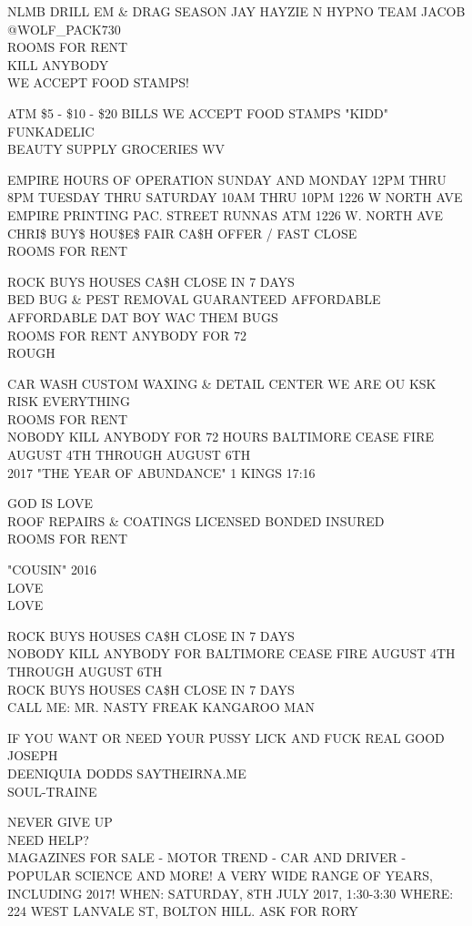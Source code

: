 \documentclass[10pt,letterpaper]{article}
\begin{document}
NLMB DRILL EM \& DRAG SEASON JAY HAYZIE N HYPNO TEAM JACOB @WOLF\_PACK730\\
ROOMS FOR RENT\\
KILL ANYBODY\\
WE ACCEPT FOOD STAMPS!

ATM \$5 {-} \$10 {-} \$20 BILLS WE ACCEPT FOOD STAMPS "KIDD" FUNKADELIC\\
BEAUTY SUPPLY GROCERIES WV

EMPIRE HOURS OF OPERATION SUNDAY AND MONDAY 12PM THRU 8PM TUESDAY THRU SATURDAY 10AM THRU 10PM 1226 W NORTH AVE\\
EMPIRE PRINTING PAC. STREET RUNNAS ATM 1226 W. NORTH AVE\\
CHRI\$ BUY\$ HOU\$E\$ FAIR CA\$H OFFER / FAST CLOSE\\
ROOMS FOR RENT

ROCK BUYS HOUSES CA\$H CLOSE IN 7 DAYS\\
BED BUG \& PEST REMOVAL GUARANTEED AFFORDABLE AFFORDABLE DAT BOY WAC THEM BUGS\\
ROOMS FOR RENT ANYBODY FOR 72\\
ROUGH

CAR WASH CUSTOM WAXING \& DETAIL CENTER WE ARE OU KSK RISK EVERYTHING\\
ROOMS FOR RENT\\
NOBODY KILL ANYBODY FOR 72 HOURS BALTIMORE CEASE FIRE AUGUST 4TH THROUGH AUGUST 6TH\\
2017 "THE YEAR OF ABUNDANCE" 1 KINGS 17:16

GOD IS LOVE\\
ROOF REPAIRS \& COATINGS LICENSED BONDED INSURED\\
ROOMS FOR RENT

"COUSIN" 2016\\
LOVE\\
LOVE

ROCK BUYS HOUSES CA\$H CLOSE IN 7 DAYS\\
NOBODY KILL ANYBODY FOR BALTIMORE CEASE FIRE AUGUST 4TH THROUGH AUGUST 6TH\\
ROCK BUYS HOUSES CA\$H CLOSE IN 7 DAYS\\
CALL ME: MR. NASTY FREAK KANGAROO MAN

IF YOU WANT OR NEED YOUR PUSSY LICK AND FUCK REAL GOOD JOSEPH\\
DEENIQUIA DODDS SAYTHEIRNA.ME\\
SOUL{-}TRAINE

NEVER GIVE UP\\
NEED HELP?\\
MAGAZINES FOR SALE {-} MOTOR TREND {-} CAR AND DRIVER {-} POPULAR SCIENCE AND MORE!  A VERY WIDE RANGE OF YEARS, INCLUDING 2017!  WHEN: SATURDAY, 8TH JULY 2017, 1:30{-}3:30 WHERE: 224 WEST LANVALE ST, BOLTON HILL.  ASK FOR RORY
\end{document}
